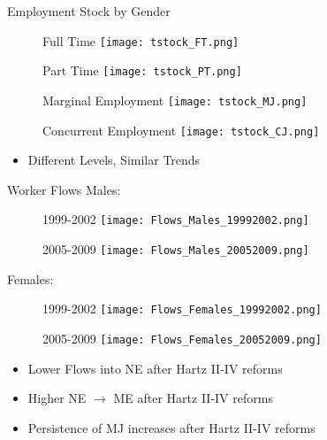 \documentclass{beamer}
\begin{document}
\begin{frame}{Employment Stock by Gender}
\begin{figure}[!t]
\centering
\begin{minipage}[b]{0.4\textwidth}{Full Time}
\centering
\texttt{[image: tstock\_FT.png]}
\end{minipage}
\begin{minipage}[b]{0.4\textwidth}{Part Time}
\centering
\texttt{[image: tstock\_PT.png]}
\end{minipage}
\begin{minipage}[b]{0.4\textwidth}{Marginal Employment}
\centering
\texttt{[image: tstock\_MJ.png]}
\end{minipage}
\begin{minipage}[b]{0.4\textwidth}{Concurrent Employment}
\centering
\texttt{[image: tstock\_CJ.png]}
\end{minipage}
\end{figure}
\begin{itemize}
\setlength{\itemsep}{0.7 cm}
\item Different Levels, Similar Trends
\end{itemize}
\end{frame}

\begin{frame}{Worker Flows}\label{WF}
Males:
\begin{figure}[!t]
\centering
\begin{minipage}[b]{0.48\textwidth}{1999-2002}
\centering
\texttt{[image: Flows\_Males\_19992002.png]}
\end{minipage}
\begin{minipage}[b]{0.48\textwidth}{2005-2009}
\centering
\texttt{[image: Flows\_Males\_20052009.png]}
\end{minipage}
\end{figure}
Females:
\begin{figure}[!t]
\centering
\begin{minipage}[b]{0.48\textwidth}{1999-2002}
\centering
\texttt{[image: Flows\_Females\_19992002.png]}
\end{minipage}
\begin{minipage}[b]{0.48\textwidth}{2005-2009}
\centering
\texttt{[image: Flows\_Females\_20052009.png]}
\end{minipage}
\end{figure}
\begin{itemize}
\setlength{\itemsep}{0.2 cm}
\item Lower Flows into NE after Hartz II-IV reforms
\item Higher NE $\rightarrow$ ME after Hartz II-IV reforms
\item Persistence of MJ increases after Hartz II-IV reforms
\end{itemize}
\hyperlink{LTEI_App}{}
\end{frame}
\end{document}
